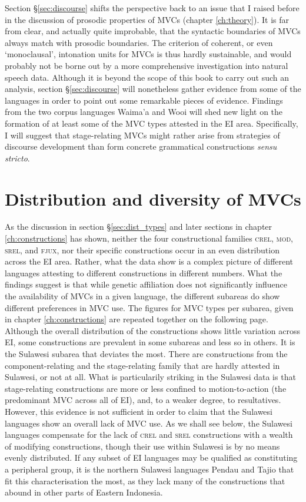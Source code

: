 Section §\ref{sec:discourse} shifts the perspective back to an issue that I raised before in the discussion of prosodic properties of MVCs (chapter \ref{ch:theory}). It is far from clear, and actually quite improbable, that the syntactic boundaries of MVCs always match with prosodic boundaries. The criterion of coherent, or even `monoclausal', intonation units for MVCs is thus hardly sustainable, and would probably not be borne out by a more comprehensive investigation into natural speech data. Although it is beyond the scope of this book to carry out such an analysis, section §\ref{sec:discourse} will nonetheless gather evidence from some of the languages in order to point out some remarkable pieces of evidence. Findings from the two corpus languages Waima'a and Wooi will shed new light on the formation of at least some of the MVC types attested in the EI area. Specifically, I will suggest that stage-relating MVCs might rather arise from strategies of discourse development than form concrete grammatical constructions \textit{sensu stricto}.

\section{Distribution and diversity of MVCs} \label{sec:distribution}

As the discussion in section §\ref{sec:dist_types} and later sections in chapter \ref{ch:constructions} has shown, neither the four constructional families \textsc{crel}, \textsc{mod}, \textsc{srel}, and \textsc{fjux}, nor their specific constructions occur in an even distribution across the EI area. Rather, what the data show is a complex picture of different languages attesting to different constructions in different numbers. What the findings suggest is that while genetic affiliation does not significantly influence the availability of MVCs in a given language, the different subareas do show different preferences in MVC use. The figures for MVC types per subarea, given in chapter \ref{ch:constructions} are repeated together on the following page. Although the overall distribution of the constructions shows little variation across EI, some constructions are prevalent in some subareas and less so in others. It is the Sulawesi subarea that deviates the most. There are constructions from the component-relating and the stage-relating family that are hardly attested in Sulawesi, or not at all. What is particularily striking in the Sulawesi data is that stage-relating constructions are more or less confined to motion-to-action (the predominant MVC across all of EI), and, to a weaker degree, to resultatives. However, this evidence is not sufficient in order to claim that the Sulawesi languages show an overall lack of MVC use. As we shall see below, the Sulawesi languages compensate for the lack of \textsc{crel} and \textsc{srel} constructions with a wealth of modifying constructions, though their use within Sulawesi is by no means evenly distributed. If any subset of EI languages may be qualified as constituting a peripheral group, it is the northern Sulawesi languages Pendau and Tajio that fit this characterisation the most, as they lack many of the constructions that abound in other parts of Eastern Indonesia.

